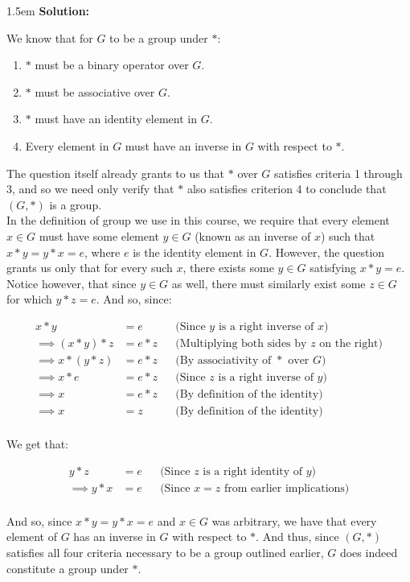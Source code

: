 \documentclass{article}
\newenvironment{solution}{
	\vspace{.5em}
	\par
	\begin{adjustwidth}{1.5em}{}
	\textbf{{Solution:}}
	\par
	\vspace{.5em}
}{
	\vspace{1em}
	\end{adjustwidth}
	\setcounter{step}{0}
}
\newcounter{step}
\begin{document}
\begin{solution}
	We know that for $G$ to be a group under $\ast$:
	\begin{enumerate}
		\item $\ast$ must be a binary operator over $G$.
		\item $\ast$ must be associative over $G$.
		\item $\ast$ must have an identity element in $G$.
		\item Every element in $G$ must have an inverse in $G$ with respect to $\ast$. \\
	\end{enumerate}

	The question itself already grants to us that $\ast$ over $G$ satisfies criteria 1 through 3, and so we need only verify that $\ast$ also satisfies criterion 4 to conclude that $(G, \ast)$ is a group. \\

	In the definition of group we use in this course, we require that every element $x \in G$ must have some element $y \in G$ (known as an inverse of $x$) such that $x \ast y = y \ast x = e$, where $e$ is the identity element in $G$. However, the question grants us only that for every such $x$, there exists some $y \in G$ satisfying $x \ast y = e$. \\

	Notice however, that since $y \in G$ as well, there must similarly exist some $z \in G$ for which $y \ast z = e$. And so, since:

	\begin{align*}
		x \ast y &= e &&\text{(Since $y$ is a right inverse of $x$)} \\
		\implies (x \ast y) \ast z &= e \ast z &&\text{(Multiplying both sides by $z$ on the right)} \\
		\implies x \ast (y \ast z) &= e \ast z &&\text{(By associativity of $\ast$ over $G$)} \\
		\implies x \ast e &= e \ast z &&\text{(Since $z$ is a right inverse of $y$)} \\
		\implies x &= e \ast z &&\text{(By definition of the identity)} \\
		\implies x &= z &&\text{(By definition of the identity)} \\
	\end{align*}

	We get that:

	\begin{align*}
		y \ast z &= e &&\text{(Since $z$ is a right identity of $y$)} \\
		\implies y \ast x &= e &&\text{(Since $x = z$ from earlier implications)} \\
	\end{align*}

	And so, since $x \ast y = y \ast x = e$ and $x \in G$ was arbitrary, we have that every element of $G$ has an inverse in $G$ with respect to $\ast$. And thus, since $(G, \ast)$ satisfies all four criteria necessary to be a group outlined earlier, $G$ does indeed constitute a group under $\ast$.
\end{solution}
\end{document}

